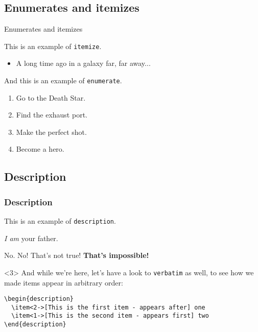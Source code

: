 \documentclass[usenames,dvipsnames,10pt,aspectratio=169]{beamer}
\begin{document}
\subsection{Enumerates and itemizes}


\begin{frame}{Enumerates and itemizes}

This is an example of \texttt{itemize}.
\begin{itemize}
	\item A long time ago in a galaxy far, far away...
\end{itemize}
And this is an example of \texttt{enumerate}.

\begin{enumerate} 
  \item Go to the Death Star.
  \item Find the exhaust port.
  \item Make the perfect shot.
  \item Become a hero.
\end{enumerate}
\end{frame}

\subsection{Description}

\begin{frame}[fragile]
\frametitle{Description}
This is an example of \texttt{description}.

\begin{description}
\item<2->[Vader] \emph{I am} your father.
\item<1->[Luke] No. No! That's not true! \textbf{That's impossible!}
\end{description}

\begin{uncoverenv}<3>
  \vskip 0.5cm
  And while we're here, let's have a look to \texttt{verbatim} as well, to see how we made items appear in arbitrary order:
  \vskip 0.5cm
  \begin{verbatim}
\begin{description}
  \item<2->[This is the first item - appears after] one
  \item<1->[This is the second item - appears first] two
\end{description}
  \end{verbatim}
\end{uncoverenv}

\end{frame}
\end{document}
